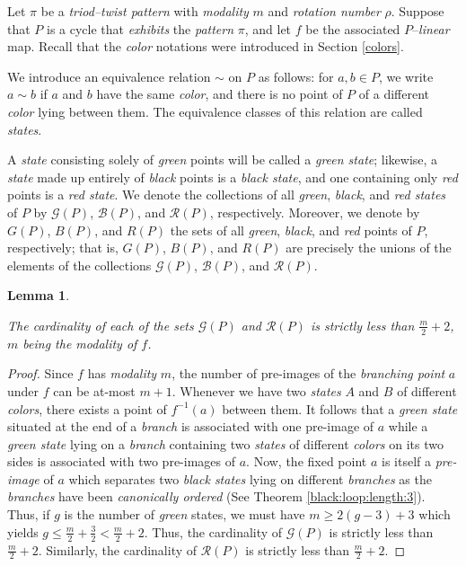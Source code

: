 \documentclass[12pt,reqno]{amsart}
\newtheorem{lemma}[theorem]{Lemma}
\theoremstyle{definition}
\theoremstyle{remark}
\theoremstyle{assumption}
\numberwithin{equation}{section}
\begin{document}
Let $\pi$ be a \emph{triod–twist pattern} with \emph{modality} $m$ and
\emph{rotation number} $\rho$. Suppose that $P$ is a cycle that
\emph{exhibits}  the \emph{pattern} $\pi$, and let $f$ be the associated
$P$–\emph{linear} map. Recall that the \emph{color} notations were introduced in Section \ref{colors}. 


 We introduce an equivalence relation $\sim$ on $P$ as follows: for 
$a,b \in P$, we write $a \sim b$ if $a$ and $b$ have the same \emph{color}, 
and there is no point of $P$ of a different \emph{color} lying between them.  The equivalence classes of this relation are called \emph{states}. 


 A \emph{state} consisting solely of \emph{green} points will be called a
 \emph{green state}; likewise, a \emph{state} made up entirely of \emph{black}
 points is a \emph{black state}, and one containing only \emph{red} points
 is a \emph{red state}. We denote the collections of all \emph{green}, \emph{black},
 and \emph{red states} of $P$ by $\mathcal{G}(P)$, $\mathcal{B}(P)$, and
 $\mathcal{R}(P)$, respectively. Moreover, we denote by $G(P)$, $B(P)$, and $R(P)$ the sets of all
 \emph{green}, \emph{black}, and \emph{red} points of $P$, respectively;
 that is, $G(P)$, $B(P)$, and $R(P)$ are precisely the unions of the
 elements of the collections $\mathcal{G}(P)$, $\mathcal{B}(P)$, and
 $\mathcal{R}(P)$.


\begin{lemma}\label{first:lemma}
 
The  cardinality of each of the sets $\mathcal{G}(P)$ and  $\mathcal{R}(P)$ is strictly less than $\frac{m}{2}+2$, $m$ being the modality of $f$. 
\end{lemma}

\begin{proof}
	Since $f$ has \emph{modality} $m$, the number of pre-images of the \emph{branching point} $a$ under $f$ can be at-most $m+1$. 	Whenever we have two \emph{states} $A$ and $B$ of different \emph{colors}, there exists a point of $f^{-1}(a)$ between them. It follows that a \emph{green state} situated at the end of a \emph{branch} is associated with one pre-image of $a$ while a \emph{green state} lying on a \emph{branch} containing two \emph{states} of different \emph{colors} on its two sides is associated with two pre-images of $a$. Now, the fixed point $a$ is itself a \emph{pre-image} of $a$ which separates two \emph{black states} lying on different \emph{branches} as the \emph{branches} have been \emph{canonically ordered} (See Theorem \ref{black:loop:length:3}). Thus, if $g$ is the number of \emph{green} states, we must have $m \geqslant 2 (g - 3) + 3$ which yields $g \leqslant \frac{m}{2} + \frac{3}{2} <  \frac{m}{2}+2$. Thus, the cardinality of  $\mathcal{G}(P)$ is strictly less than $\frac{m}{2}+2$. Similarly, the cardinality of  $\mathcal{R}(P)$ is strictly less than $\frac{m}{2}+2$. 
\end{proof}
\end{document}
